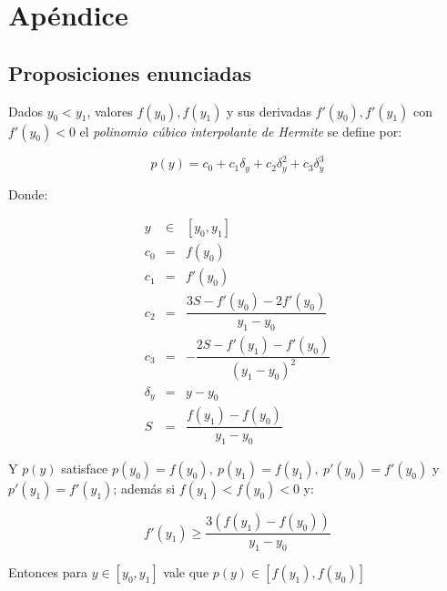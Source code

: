 \chapter{Ap\'endice}\label{ch: apendice}

\section{Proposiciones enunciadas}

\begin{theorem}
	\label{theorem: splines 1}
	Dados $y_0 < y_1$, valores $f(y_0), f(y_1)$ y sus derivadas $f'(y_0), f'(y_1)$ con $f'(y_0)<0$ el \textit{polinomio c\'ubico interpolante de Hermite} se define por:
	
	\begin{equation}
	p(y) = c_0 + c_1 \delta_y + c_2 \delta_y^2 + c_3 \delta_y^3
	\end{equation}
	
	Donde:
	
	\begin{equation*}
		\begin{array}{rcl}
		y & \in & [y_0, y_1] \\
		c_0 & = & f(y_0) \\
		c_1 & = & f'(y_0) \\
		c_2 & = & \dfrac{3S - f'(y_0) - 2f'(y_0)}{y_1 - y_0} \\
		c_3 & = & - \dfrac{2S - f'(y_1) - f'(y_0)}{\left(y_1 - y_0\right)^2} \\
		\delta_y & = & y - y_0 \\
		S & = & \dfrac{f(y_1) - f(y_0)}{y_1 - y_0}
		\end{array}
	\end{equation*}
	
	Y $p(y)$ satisface $p(y_0) = f(y_0), \ p(y_1) = f(y_1), \ p'(y_0) = f'(y_0)$ y $p'(y_1)=f'(y_1)$; adem\'as si $f(y_1) < f(y_0) < 0$ y:
	
	\begin{equation*}
		f'(y_1) \geq \dfrac{3 \left(f(y_1) - f(y_0)\right)}{y_1 - y_0}
	\end{equation*}
	
	Entonces para $y \in [y_0, y_1]$ vale que $p(y) \in \left[f(y_1), f(y_0)\right]$
	
\end{theorem}

